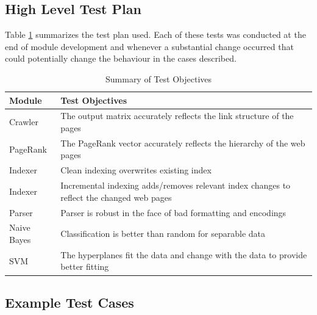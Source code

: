 \documentclass[12pt,a4paper,notitlepage,twoside]{scrbook}
\begin{document}
\subsection{High Level Test Plan}
Table \ref{tab:test} summarizes the test plan used. Each of these tests
was conducted at the end of module development and whenever a substantial change occurred
that could potentially change the behaviour in the cases described.
\begin{table}[h!]
	\begin{tabular}[h!]{l p{12cm}}
	\textbf{Module} & \textbf{Test Objectives}\\ \hline
Crawler & The output matrix accurately reflects the link structure of the pages \\
PageRank & The PageRank vector accurately reflects the hierarchy of the web pages \\
Indexer & Clean indexing overwrites existing index \\
Indexer & Incremental indexing adds/removes relevant index changes to reflect the changed
web pages \\
Parser & Parser is robust in the face of bad formatting and encodings \\
Naive Bayes & Classification is better than random for separable data \\
SVM & The hyperplanes fit the data and change with the data to provide better fitting 
\end{tabular}
\caption{Summary of Test Objectives\label{tab:test}}
\end{table}
\subsection{Example Test Cases}
\end{document}
